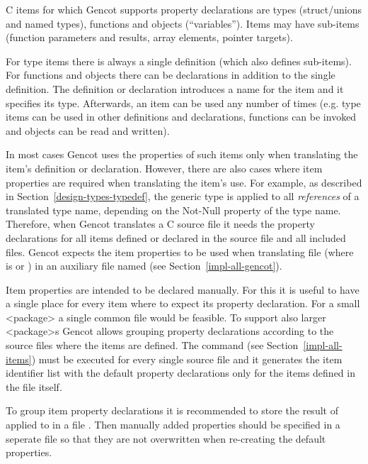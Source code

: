 C items for which Gencot supports property declarations are types (struct/unions and named types), functions and objects (``variables'').
Items may have sub-items (function parameters and results, array elements, pointer targets). 

For type items there is always a single definition (which also defines sub-items). For functions and objects there 
can be declarations
in addition to the single definition. The definition or declaration introduces a name for the item and it specifies its type.
Afterwards, an item can be used any number of times (e.g. type items can be used in other definitions and declarations, functions
can be invoked and objects can be read and written).

In most cases Gencot uses the properties of such items only when translating the item's definition or declaration. However, there 
are also cases where item properties are required when translating the item's use. For example, as described in 
Section~\ref{design-types-typedef}, the generic type  is applied to all \textit{references} of a translated type 
name, depending on the Not-Null property of the type name. Therefore, when Gencot translates a C source file it needs the 
property declarations for all items defined or declared in the source file and all included files.
Gencot expects the item properties to be used when translating file  (where  
is  or ) in an auxiliary file named  (see Section~\ref{impl-all-gencot}).

Item properties are intended to be declared manually. For this it is useful to have a single place for every item where
to expect its property declaration. For a small <package> a single common file would be feasible. To support also larger
<package>s Gencot allows grouping property declarations according to the source files where the items are defined. The 
command  (see Section~\ref{impl-all-items}) must be executed for every single source file and it 
generates the item identifier list with the default property declarations only for the items defined in the file itself.

To group item property declarations it is recommended to store the result of  applied to 
in a file . Then manually added properties should be specified in a seperate file 
so that they are not overwritten when re-creating the default properties. 

